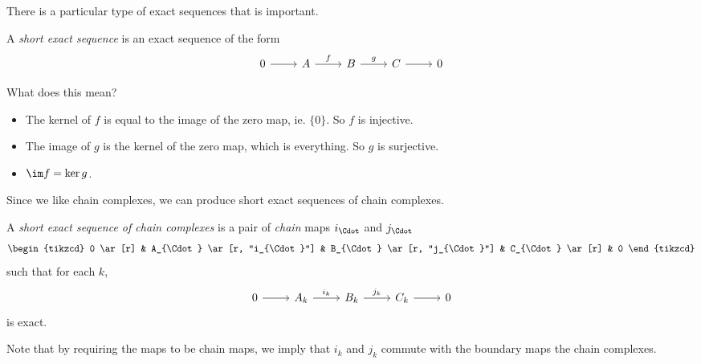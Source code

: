 \documentclass[a4paper]{article}
\begin{document}
There is a particular type of exact sequences that is important.

\begin{defi}
  A \emph{short exact sequence} is an exact sequence of the form
  \[
    \begin{tikzcd}
      0 \ar [r] & A \ar [r, "f"] & B \ar [r, "g"] & C \ar[r] & 0
    \end{tikzcd}
  \]
\end{defi}
What does this mean?
\begin{itemize}
  \item The kernel of $f$ is equal to the image of the zero map, ie. $\{0\}$. So $f$ is injective.
  \item The image of $g$ is the kernel of the zero map, which is everything. So $g$ is surjective.
  \item $\im f = \ker g$.
\end{itemize}

Since we like chain complexes, we can produce short exact sequences of chain complexes.
\begin{defi}
  A \emph{short exact sequence of chain complexes} is a pair of \emph{chain} maps $i_{\Cdot}$ and $j_{\Cdot}$
  \[
    \begin{tikzcd}
      0 \ar[r] & A_{\Cdot} \ar [r, "i_{\Cdot}"] & B_{\Cdot} \ar [r, "j_{\Cdot}"] & C_{\Cdot} \ar[r] & 0
    \end{tikzcd}
  \]
  such that for each $k$,
  \[
    \begin{tikzcd}
      0 \ar[r] & A_k \ar [r, "i_k"] & B_k \ar [r, "j_k"] & C_k \ar[r] & 0
    \end{tikzcd}
  \]
  is exact.
\end{defi}
Note that by requiring the maps to be chain maps, we imply that $i_k$ and $j_k$ commute with the boundary maps the chain complexes.
\end{document}
